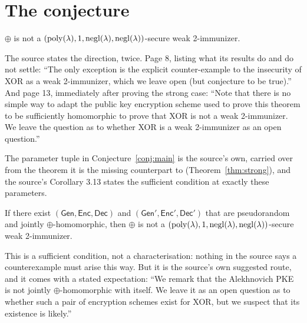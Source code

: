 \documentclass{aicr-conjecture}
\newcommand{\negl}{\mathrm{negl}}
\newcommand{\Gen}{\mathsf{Gen}}
\newcommand{\Enc}{\mathsf{Enc}}
\newcommand{\Dec}{\mathsf{Dec}}
\begin{document}
\section{The conjecture}\label{sec:conjectures}

\begin{conjecture}\label{conj:main}
$\oplus$ is not a $(\poly(\lambda), 1, \negl(\lambda),
\negl(\lambda))$-secure weak 2-immunizer.
\end{conjecture}

\begin{remark}\label{rem:framing}
The source states the direction, twice. Page 8, listing what its results
do and do not settle: ``The only exception is the explicit counter-example
to the insecurity of XOR as a weak 2-immunizer, which we leave open (but
conjecture to be true).'' And page 13, immediately after proving the
strong case: ``Note that there is no simple way to adapt the public key
encryption scheme used to prove this theorem to be sufficiently
homomorphic to prove that XOR is not a weak 2-immunizer. We leave the
question as to whether XOR is a weak 2-immunizer as an open question.''

The parameter tuple in Conjecture~\ref{conj:main} is the source's own,
carried over from the theorem it is the missing counterpart to
(Theorem~\ref{thm:strong}), and the source's Corollary 3.13 states the
sufficient condition at exactly these parameters.
\end{remark}

\begin{theorem}\label{thm:route}
If there exist $(\Gen,\Enc,\Dec)$ and $(\Gen',\Enc',\Dec')$ that are
pseudorandom and jointly $\oplus$-homomorphic, then $\oplus$ is not a
$(\poly(\lambda), 1, \negl(\lambda), \negl(\lambda))$-secure weak
2-immunizer.
\end{theorem}

This is a sufficient condition, not a characterisation: nothing in the
source says a counterexample must arise this way. But it is the source's
own suggested route, and it comes with a stated expectation: ``We remark
that the Alekhnovich PKE is not jointly $\oplus$-homomorphic with itself.
We leave it as an open question as to whether such a pair of encryption
schemes exist for XOR, but we suspect that its existence is likely.''
\end{document}
